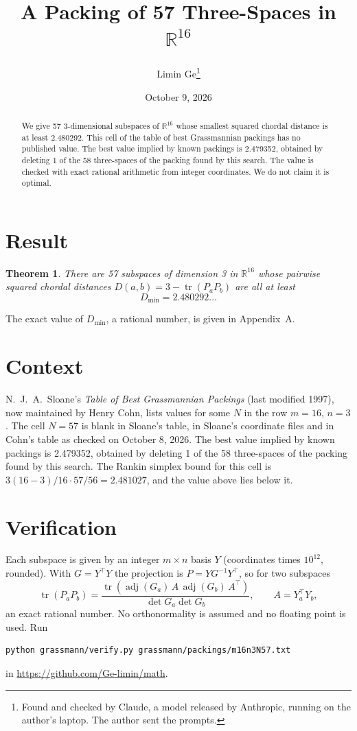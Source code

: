 \documentclass[11pt,a4paper]{article}
\title{A Packing of 57 Three-Spaces in $\mathbb{R}^{16}$}
\author{Limin Ge\thanks{Found and checked by Claude, a model released by Anthropic, running on the author's laptop. The author sent the prompts.}}
\date{October 9, 2026}
\newtheorem*{theorem}{Theorem}
\begin{document}
\maketitle
\begin{abstract}
We give 57 3-dimensional subspaces of $\mathbb{R}^{16}$ whose smallest squared chordal distance is at least 2.480292. This cell of the table of best Grassmannian packings has no published value. The best value implied by known packings is 2.479352, obtained by deleting 1 of the 58 three-spaces of the packing found by this search. The value is checked with exact rational arithmetic from integer coordinates. We do not claim it is optimal.
\end{abstract}

\section{Result}
\begin{theorem}
There are 57 subspaces of dimension 3 in $\mathbb{R}^{16}$ whose pairwise squared chordal distances $D(a,b) = 3 - \operatorname{tr}(P_aP_b)$ are all at least
\[ D_{\min} = 2.480292\ldots \]
\end{theorem}
The exact value of $D_{\min}$, a rational number, is given in Appendix~A.


\section{Context}
N.~J.~A.~Sloane's \emph{Table of Best Grassmannian Packings} (last modified 1997), now maintained by Henry Cohn, lists values for some $N$ in the row $m=16$, $n=3$. The cell $N=57$ is blank in Sloane's table, in Sloane's coordinate files and in Cohn's table as checked on October 8, 2026. The best value implied by known packings is 2.479352, obtained by deleting 1 of the 58 three-spaces of the packing found by this search. The Rankin simplex bound for this cell is $3(16-3)/16\cdot 57/56 = 2.481027$, and the value above lies below it.


\section{Verification}
Each subspace is given by an integer $m\times n$ basis $Y$ (coordinates times $10^{12}$, rounded). With $G=Y^\top Y$ the projection is $P=YG^{-1}Y^\top$, so for two subspaces
\[ \operatorname{tr}(P_aP_b)=\frac{\operatorname{tr}(\operatorname{adj}(G_a)\,A\,\operatorname{adj}(G_b)\,A^\top)}{\det G_a\det G_b},\qquad A=Y_a^\top Y_b, \]
an exact rational number. No orthonormality is assumed and no floating point is used. Run
\begin{verbatim}
python grassmann/verify.py grassmann/packings/m16n3N57.txt
\end{verbatim}
in \url{https://github.com/Ge-limin/math}.
\end{document}

